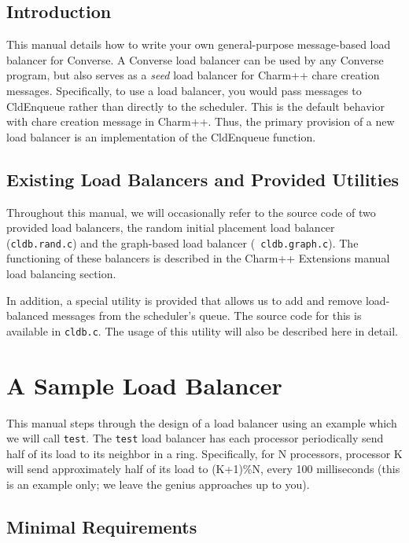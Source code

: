 \subsection{Introduction}

This manual details how to write your own general-purpose
message-based load balancer for Converse.
A Converse load balancer can be used by any Converse program, but also
serves as a {\sl seed} load balancer for Charm++ chare creation messages.
Specifically, to use a load balancer, you would pass messages to
CldEnqueue rather than directly to the scheduler.  This is the default
behavior with chare creation message in Charm++.  Thus, the primary
provision of a new load balancer is an implementation of the
CldEnqueue function.

\subsection{Existing Load Balancers and Provided Utilities}

Throughout this manual, we will occasionally refer to the source code
of two provided load balancers, the random initial placement load balancer
({\tt cldb.rand.c}) and the graph-based load balancer ({\tt
cldb.graph.c}).  The functioning of these balancers is described in
the Charm++ Extensions manual load balancing section.

In addition, a special utility is provided that allows us to add and
remove load-balanced messages from the scheduler's queue.  The source
code for this is available in {\tt cldb.c}.  The usage of this utility
will also be described here in detail.

\section{A Sample Load Balancer}

This manual steps through the design of a load balancer using an
example which we will call {\tt test}.  The {\tt test} load balancer
has each processor periodically send half of its load to its neighbor
in a ring.  Specifically, for N processors, processor K will send
approximately half of its load to (K+1)\%N, every 100 milliseconds
(this is an example only; we leave the genius approaches up to you).

\subsection{Minimal Requirements}

